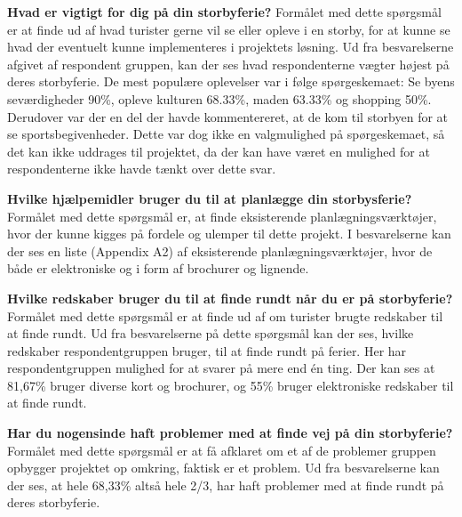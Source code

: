 \textbf{Hvad er vigtigt for dig på din storbyferie?}\newline
Formålet med dette spørgsmål er at finde ud af hvad turister gerne vil se eller opleve i en storby, for at kunne se hvad der eventuelt kunne implementeres i projektets løsning.\newline
Ud fra besvarelserne afgivet af respondent gruppen, kan der ses hvad respondenterne vægter højest på deres storbyferie. De mest populære oplevelser var i følge spørgeskemaet: Se byens seværdigheder 90\%, opleve kulturen 68.33\%, maden 63.33\% og shopping 50\%. Derudover var der en del der havde kommentereret, at de kom til storbyen for at se sportsbegivenheder. Dette var dog ikke en valgmulighed på spørgeskemaet, så det kan ikke uddrages til projektet, da der kan have været en mulighed for at respondenterne ikke havde tænkt over dette svar.\newline

\textbf{Hvilke hjælpemidler bruger du til at planlægge din storbysferie?}\newline
Formålet med dette spørgsmål er, at finde eksisterende planlægningsværktøjer, hvor der kunne kigges på fordele og ulemper til dette projekt.\newline 
I besvarelserne kan der ses en liste (Appendix A2) af eksisterende planlægningsværktøjer, hvor de både er elektroniske og i form af brochurer og lignende.\newline
 
\textbf{Hvilke redskaber bruger du til at finde rundt når du er på storbyferie?}\newline
Formålet med dette spørgsmål er at finde ud af om turister brugte redskaber til at finde rundt.\newline 
Ud fra besvarelserne på dette spørgsmål kan der ses, hvilke redskaber respondentgruppen bruger, til at finde rundt på ferier. Her har respondentgruppen mulighed for at svarer på mere end én ting. Der kan ses at 81,67\% bruger diverse kort og brochurer, og 55\% bruger elektroniske redskaber til at finde rundt. \newline

\textbf{Har du nogensinde haft problemer med at finde vej på din storbyferie?}\newline
Formålet med dette spørgsmål er at få afklaret om et af de problemer gruppen opbygger projektet op omkring, faktisk er et problem.\newline
Ud fra besvarelserne kan der ses, at hele 68,33\% altså hele 2/3, har haft problemer med at finde rundt på deres storbyferie.\newline

